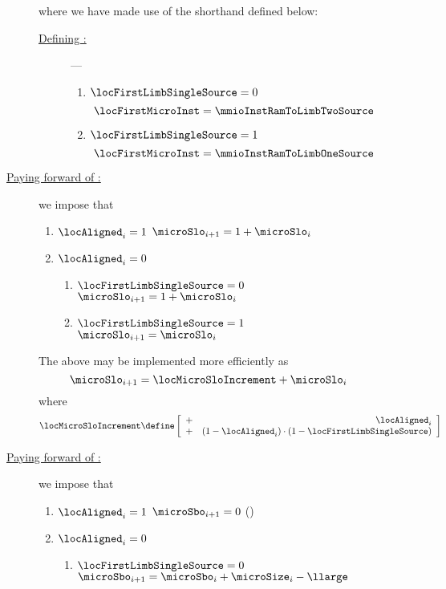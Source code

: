 \begin{description}
\begin{description}
\[				\]
				where we have made use of the shorthand \locFirstMicroInst{} defined below:
				\begin{description}
					\item[\underline{Defining \locFirstMicroInst:}] ---
						\begin{enumerate}
							\item \If $\locFirstLimbSingleSource = 0$ \Then \[ \locFirstMicroInst = \mmioInstRamToLimbTwoSource \]
							\item \If $\locFirstLimbSingleSource = 1$ \Then \[ \locFirstMicroInst = \mmioInstRamToLimbOneSource \]
						\end{enumerate}
				\end{description}
			\item[\underline{Paying forward of \microSlo{}:}]
				we impose that
				\begin{enumerate}
					\item \If $\locAligned_{i} = 1$ \Then $\microSlo_{i + 1} = 1 + \microSlo_{i}$
					\item \If $\locAligned_{i} = 0$ \Then 
						\begin{enumerate}
							\item \If $\locFirstLimbSingleSource = 0$ \Then $\microSlo_{i + 1} = 1 + \microSlo_{i}$
							\item \If $\locFirstLimbSingleSource = 1$ \Then $\microSlo_{i + 1} = \microSlo_{i}$
						\end{enumerate}
				\end{enumerate}
				\saNote{} The above may be implemented more efficiently as
				\[ \microSlo_{i + 1} = \locMicroSloIncrement  + \microSlo_{i} \]
				where
				\[
					\locMicroSloIncrement \define
					\left[ \begin{array}{cr}
						+ & \locAligned_{i}                                             \\
						+ & (1 - \locAligned_{i}) \cdot (1 - \locFirstLimbSingleSource) \\
					\end{array} \right]
				\]
			\item[\underline{Paying forward of \microSbo{}:}]
				we impose that
				\begin{enumerate}
					\item \If $\locAligned_{i} = 1$ \Then $\microSbo_{i + 1} = 0$ \quad(\trash)
					\item \If $\locAligned_{i} = 0$ \Then
						\begin{enumerate}
							\item \If $\locFirstLimbSingleSource = 0$ \Then $\microSbo_{i + 1} = \microSbo_{i} + \microSize_{i} - \llarge$

\end{enumerate}
\end{enumerate}
\end{description}
\end{description}
